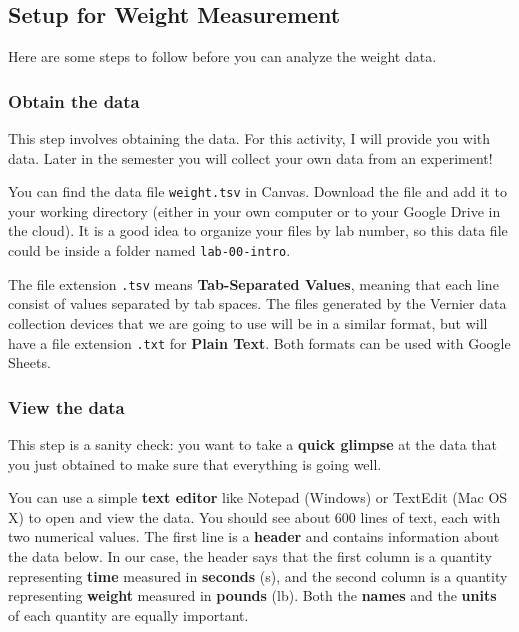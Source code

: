 \subsection{Setup for Weight Measurement}
Here are some steps to follow before you can analyze the weight data.
\subsubsection{Obtain the data}
This step involves obtaining the data. For this activity, I will provide you with data. Later in the semester you will collect your own data from an experiment!

You can find the data file \texttt{weight.tsv} in Canvas. Download the file and add it to your working directory (either in your own computer or to your Google Drive in the cloud). It is a good idea to organize your files by lab number, so this data file could be inside a folder named \texttt{lab-00-intro}.

The file extension \texttt{.tsv} means \textbf{Tab-Separated Values}, meaning that each line consist of values separated by tab spaces. The files generated by the Vernier data collection devices that we are going to use will be in a similar format, but will have a file extension \texttt{.txt} for \textbf{Plain Text}. Both formats can be used with Google Sheets.
\subsubsection{View the data}
This step is a sanity check: you want to take a \textbf{quick glimpse} at the data that you just obtained to make sure that everything is going well.

You can use a simple \textbf{text editor} like Notepad (Windows) or TextEdit (Mac OS X) to open and view the data. You should see about 600 lines of text, each with two numerical values. The first line is a \textbf{header} and contains information about the data below. In our case, the header says that the first column is a quantity representing \textbf{time} measured in \textbf{seconds} (s), and the second column is a quantity representing \textbf{weight} measured in \textbf{pounds} (lb). Both the \textbf{names} and the \textbf{units} of each quantity are equally important.

